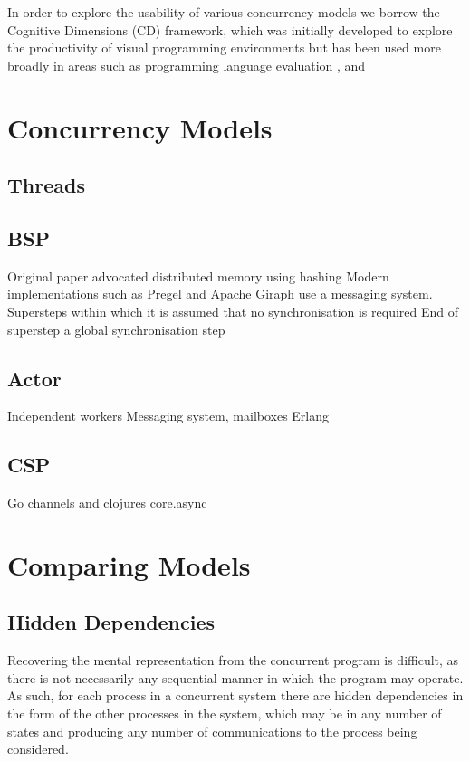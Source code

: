 \documentclass{sig-alternate}
\begin{document}
In order to explore the usability of various concurrency models we borrow the Cognitive Dimensions \cite{green89:_cognit_dimen_notat} (CD) framework, which was initially developed to explore the productivity of visual programming environments but has been used more broadly in areas such as programming language evaluation \cite{enpl}, and 

\section{Concurrency Models}
\subsection{Threads}


\subsection{BSP}
Original paper advocated distributed memory using hashing
Modern implementations such as Pregel and Apache Giraph use a messaging system.
Supersteps within which it is assumed that no synchronisation is required
End of superstep a global synchronisation step

\subsection{Actor}
Independent workers
Messaging system, mailboxes
Erlang

\subsection{CSP}
Go channels and clojures core.async

\subsection{}

\section{Comparing Models}

\subsection{Hidden Dependencies}

Recovering the mental representation from the concurrent program is difficult, as there is not necessarily any sequential manner in which the program may operate. As such, for each process in a concurrent system there are hidden dependencies in the form of the other processes in the system, which may be in any number of states and producing any number of communications to the process being considered.
\end{document}
